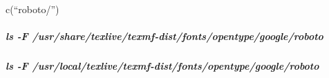 \documentclass[
]{article}
\newenvironment{Shaded}{\begin{snugshade}}{\end{snugshade}}
\newcommand{\AttributeTok}[1]{\textcolor[rgb]{0.13,0.29,0.53}{#1}}
\newcommand{\ConstantTok}[1]{\textcolor[rgb]{0.56,0.35,0.01}{#1}}
\newcommand{\ControlFlowTok}[1]{\textcolor[rgb]{0.13,0.29,0.53}{\textbf{#1}}}
\newcommand{\DecValTok}[1]{\textcolor[rgb]{0.00,0.00,0.81}{#1}}
\newcommand{\FunctionTok}[1]{\textcolor[rgb]{0.13,0.29,0.53}{\textbf{#1}}}
\newcommand{\NormalTok}[1]{#1}
\newcommand{\SpecialCharTok}[1]{\textcolor[rgb]{0.81,0.36,0.00}{\textbf{#1}}}
\newcommand{\StringTok}[1]{\textcolor[rgb]{0.31,0.60,0.02}{#1}}
\begin{document}
\begin{Shaded}
\end{Shaded}

c(``roboto/'')

\hypertarget{ls--f-usrsharetexlivetexmf-distfontsopentypegoogleroboto}{%
\subparagraph{ls -F
/usr/share/texlive/texmf-dist/fonts/opentype/google/roboto}\label{ls--f-usrsharetexlivetexmf-distfontsopentypegoogleroboto}}

\hypertarget{ls--f-usrlocaltexlivetexmf-distfontsopentypegoogleroboto}{%
\subparagraph{ls -F
/usr/local/texlive/texmf-dist/fonts/opentype/google/roboto}\label{ls--f-usrlocaltexlivetexmf-distfontsopentypegoogleroboto}}
\end{document}
